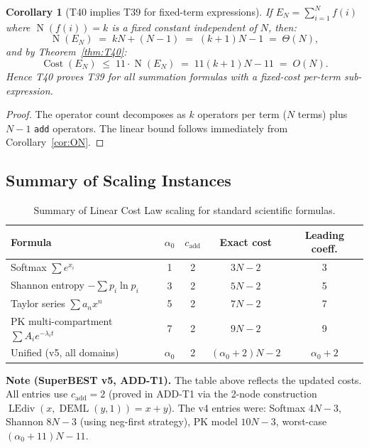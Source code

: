 \documentclass[12pt,a4paper]{article}
\newtheorem{corollary}[theorem]{Corollary}
\theoremstyle{definition}
\newcommand{\DEML}{\operatorname{DEML}}
\newcommand{\LEdiv}{\operatorname{LEdiv}}
\newcommand{\Cost}{\operatorname{Cost}}
\newcommand{\NOp}{\operatorname{N}}
\begin{document}
\begin{corollary}[T40 implies T39 for fixed-term expressions]
\label{cor:T40impliesT39}
If $E_N = \sum_{i=1}^{N} f(i)$ where $\NOp(f(i)) = k$ is a fixed constant
independent of $N$, then:
\[
  \NOp(E_N) \;=\; kN + (N-1) \;=\; (k+1)N - 1 \;=\; \Theta(N),
\]
and by Theorem~\ref{thm:T40}:
\[
  \Cost(E_N) \;\leq\; 11 \cdot \NOp(E_N) \;=\; 11(k+1)N - 11 \;=\; O(N).
\]
Hence T40 proves T39 for all summation formulas with a fixed-cost per-term
sub-expression.
\end{corollary}

\begin{proof}
The operator count decomposes as $k$ operators per term ($N$ terms) plus
$N-1$ \texttt{add} operators.  The linear bound follows immediately from
Corollary~\ref{cor:ON}.
\end{proof}

\subsection{Summary of Scaling Instances}

\begin{table}[h]
\centering
\caption{Summary of Linear Cost Law scaling for standard scientific formulas.}
\label{tab:summary}
\smallskip
\begin{tabular}{@{}lcccc@{}}
\toprule
\textbf{Formula} & $\alpha_0$ & $c_{\mathrm{add}}$ &
  \textbf{Exact cost} & \textbf{Leading coeff.} \\
\midrule
Softmax $\sum e^{x_i}$               & 1 & 2 & $3N - 2$  & 3  \\
Shannon entropy $-\sum p_i \ln p_i$  & 3 & 2 & $5N - 2$  & 5  \\
Taylor series $\sum a_n x^n$         & 5 & 2 & $7N - 2$  & 7  \\
PK multi-compartment $\sum A_i e^{-\lambda_i t}$
                                     & 7 & 2 & $9N - 2$  & 9  \\
Unified (v5, all domains)            & $\alpha_0$ & 2 & $(\alpha_0+2)N - 2$ & $\alpha_0 + 2$ \\
\bottomrule
\end{tabular}
\end{table}

\noindent\textbf{Note (SuperBEST v5, ADD-T1).}
The table above reflects the updated costs.  All entries use $c_{\mathrm{add}} = 2$
(proved in ADD-T1 via the 2-node construction $\LEdiv(x,\DEML(y,1)) = x+y$).
The v4 entries were: Softmax $4N{-}3$, Shannon $8N{-}3$ (using neg-first strategy),
PK model $10N{-}3$, worst-case $(\alpha_0+11)N-11$.
\end{document}
